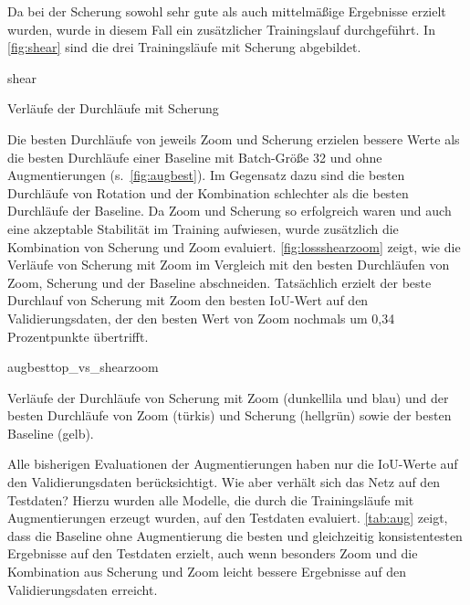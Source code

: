 Da bei der Scherung sowohl sehr gute als auch mittelmäßige Ergebnisse erzielt wurden, wurde in diesem Fall ein zusätzlicher Trainingslauf durchgeführt.
In \autoref{fig:shear} sind die drei Trainingsläufe mit Scherung abgebildet.

\begin{losses}{shear}
	\caption{Verläufe der Durchläufe mit Scherung}
	\label{fig:shear}
\end{losses}

Die besten Durchläufe von jeweils Zoom und Scherung erzielen bessere Werte als die besten Durchläufe einer Baseline mit Batch-Größe 32 und ohne Augmentierungen (s.~\autoref{fig:augbest}).
Im Gegensatz dazu sind die besten Durchläufe von Rotation und der Kombination schlechter als die besten Durchläufe der Baseline.
Da Zoom und Scherung so erfolgreich waren und auch eine akzeptable Stabilität im Training aufwiesen, wurde zusätzlich die Kombination von Scherung und Zoom evaluiert.
\autoref{fig:lossshearzoom} zeigt, wie die Verläufe von Scherung mit Zoom im Vergleich mit den besten Durchläufen von Zoom, Scherung und der Baseline abschneiden.
Tatsächlich erzielt der beste Durchlauf von Scherung mit Zoom den besten IoU-Wert auf den Validierungsdaten, der den besten Wert von Zoom nochmals um 0,34 Prozentpunkte übertrifft.

\begin{losses}{augbesttop_vs_shearzoom}
	\caption[Verläufe der Durchläufe von Scherung mit Zoom und der besten Durchläufe von Zoom und Scherung sowie der besten Baseline]{Verläufe der Durchläufe von Scherung mit Zoom (dunkellila und blau) und der besten Durchläufe von Zoom (türkis) und Scherung (hellgrün) sowie der besten Baseline (gelb).}
	\label{fig:lossshearzoom}
\end{losses}

Alle bisherigen Evaluationen der Augmentierungen haben nur die IoU-Werte auf den Validierungsdaten berücksichtigt.
Wie aber verhält sich das Netz auf den Testdaten?
Hierzu wurden alle Modelle, die durch die Trainingsläufe mit Augmentierungen erzeugt wurden, auf den Testdaten evaluiert.
\autoref{tab:aug} zeigt, dass die Baseline ohne Augmentierung die besten und gleichzeitig konsistentesten Ergebnisse auf den Testdaten erzielt, auch wenn besonders Zoom und die Kombination aus Scherung und Zoom leicht bessere Ergebnisse auf den Validierungsdaten erreicht.

